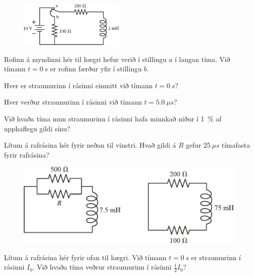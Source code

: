 \begin{enumerate}[label = \textbf{(\alph*)}]

\begin{minipage}{\linewidth}
\begin{figure}
\vspace{-0.5cm}
\includegraphics[width = 2in]{figures/rks3016.pdf}
\end{figure}

\item[\textbf{(30.16)}] Rofinn á myndinni hér til hægri hefur verið í stillingu $a$ í langan tíma. Við tímann $t = \SI{0}{s}$ er rofinn færður yfir í stillingu $b$. \begin{enumerate*}[label = \textbf{(\alph*)}]
    \item Hver er straumurinn í rásinni einmitt við tímann $t = \SI{0}{s}$?
    \item Hver verður straumurinn í rásinni við tímann $t = \SI{5.0}{\mu s}$?
    \item Við hvaða tíma mun straumurinn í rásinni hafa minnkað niður í \SI{1}{\percent} af upphaflegu gildi sínu?
\end{enumerate*}

\end{minipage}

\item[\textbf{(30.34)}] Lítum á rafrásina hér fyrir neðan til vinstri. Hvað gildi á $R$ gefur $\SI{25}{\mu s}$ tímafasta fyrir rafrásina?

\begin{figure}[H]
    \centering
    \includegraphics[scale = 1.25]{figures/rk3034.pdf}
\end{figure}

\item[\textbf{(30.35)}] Lítum á rafrásina hér fyrir ofan til hægri. Við tímann $t = \SI{0}{s}$ er straumurinn í rásinni $I_0$. Við hvaða tíma veðrur straumurinn í rásinni $\frac{1}{2}I_0$?


\end{enumerate}
